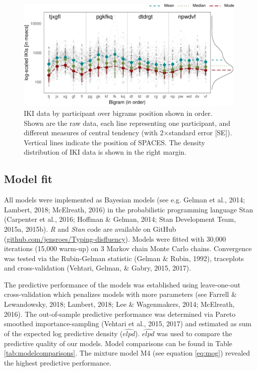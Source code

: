 \documentclass[english,man,floatsintext]{apa7}
\begin{document}
\begin{figure}[!ht]

{\centering \includegraphics{report_files/figure-latex/descriptives-1} 

}

\caption{IKI data by participant over bigrams position shown in order. Shown are the raw data, each line representing one participant, and different measures of central tendency (with 2$\times$standard error [SE]). Vertical lines indicate the position of SPACES. The density distribution of IKI data is shown in the right margin.}\label{fig:descriptives}
\end{figure}

\hypertarget{model-fit}{%
\subsection{Model fit}\label{model-fit}}

All models were implemented as Bayesian models (see e.g. Gelman et al., 2014; Lambert, 2018; McElreath, 2016) in the probabilistic programming language Stan (Carpenter et al., 2016; Hoffman \& Gelman, 2014; Stan Development Team, 2015a, 2015b). \textit{R} and \textit{Stan} code are available on GitHub (\href{https://github.com/jensroes/Typing-disfluency}{github.com/jensroes/Typing-disfluency}). Models were fitted with 30,000 iterations (15,000 warm-up) on 3 Markov chain Monte Carlo chains. Convergence was tested via the Rubin-Gelman statistic (Gelman \& Rubin, 1992), traceplots and cross-validation (Vehtari, Gelman, \& Gabry, 2015, 2017).

The predictive performance of the models was established using leave-one-out cross-validation which penalizes models with more parameters (see Farrell \& Lewandowsky, 2018; Lambert, 2018; Lee \& Wagenmakers, 2014; McElreath, 2016). The out-of-sample predictive performance was determined via Pareto smoothed importance-sampling (Vehtari et al., 2015, 2017) and estimated as sum of the expected log predictive density (\(\widehat{elpd}\)). \(\widehat{elpd}\) was used to compare the predictive quality of our models. Model comparisons can be found in Table \ref{tab:modelcomparisons}. The mixture model M4 (see equation \ref{eq:mog}) revealed the highest predictive performance.
\end{document}

